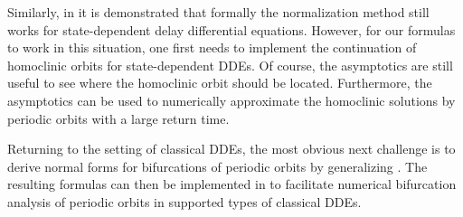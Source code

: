 Similarly, in \cite{Sieber@2017} it is demonstrated that formally the
normalization method still works for state-dependent delay differential
equations. However, for our formulas to work in this situation, one first needs
to implement the continuation of homoclinic orbits for state-dependent DDEs. Of
course, the asymptotics are still useful to see where     the homoclinic orbit
should be located. Furthermore, the asymptotics can be used to numerically
approximate the homoclinic solutions by periodic orbits with a large return
time.

Returning to the setting of classical DDEs, the most obvious next challenge is
to derive normal forms for bifurcations of periodic orbits by generalizing
\cite{Kuznetsov2005,DeWitte2013,DeWitte2014}. The resulting formulas can then
be implemented in \DDEBIFTOOL to facilitate numerical bifurcation analysis of
periodic orbits in supported types of classical DDEs.
